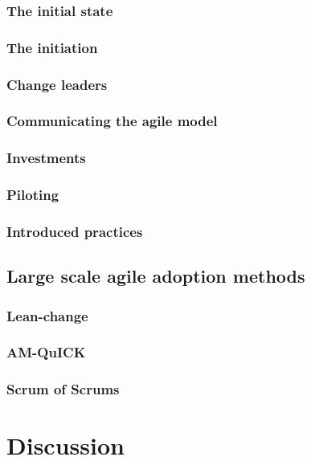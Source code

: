 \documentclass{article}
\begin{document}
\subsubsection{The initial state}

\subsubsection{The initiation}

\subsubsection{Change leaders}

\subsubsection{Communicating the agile model}

\subsubsection{Investments}

\subsubsection{Piloting}

\subsubsection{Introduced practices}

\subsection{Large scale agile adoption methods}

\subsubsection{Lean-change}

\subsubsection{AM-QuICK}

\subsubsection{Scrum of Scrums}



\section{Discussion}

\end{document}
